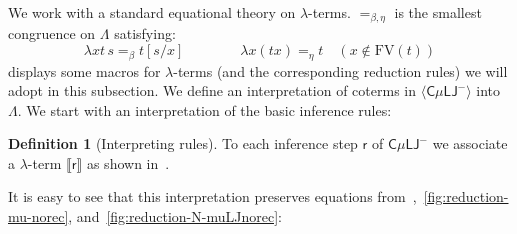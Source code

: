 \documentclass[10pt,a4paper]{amsart}
\theoremstyle{plain}
\theoremstyle{definition}
\newtheorem{defn}[defn]{Definition}
\newcommand{\dfn}{:=}
\newcommand{\red}[1]{{\color{red}#1}}
\newcommand{\gianluca}[1]{\todo[color=purple]{G: #1}}
\renewcommand{\todo}[1]{}
\renewcommand{\gianluca}[1]{}
\newcommand{\todonew}[1]{{\red{TodoNew: #1}}}
\renewcommand{\todonew}[1]{}
\theoremstyle{plain}
\theoremstyle{definition} %
\newcommand{\FV}{\mathrm{FV}}
\newcommand{\sem}[1]{\llbracket {#1} \rrbracket}
\newcommand{\lambdaterms}{\Lambda}
\newcommand{\closure}[1]{\langle #1 \rangle}
\newcommand{\infrule}{\mathsf{r}}
\newcommand{\rrule}{\infrule} %
\newcommand{\LJ}{\mathsf{LJ}}
\newcommand{\muLJ}{\mu\LJ}
\newcommand{\circular}{\mathsf C}
\newcommand{\cmuLJ}{\circular\muLJ}
\newcommand{\cmuLJneg}{\cmuLJ^-}
\newcommand{\reduction}{\mathrm{r}}
\newcommand{\converts}{=_{\reduction}}
\newcommand{\eqter}{\converts} %
\newcommand{\betae}{=_{\beta}}
\newcommand{\betaeta}{=_{\beta, \eta}}
\begin{document}
We work with a standard equational theory on $\lambda$-terms. 
$\betaeta$ is the smallest congruence on $\lambdaterms$ satisfying:
\[
\lambda x t\,  s \betae  t[s/x] \qquad \qquad \lambda x ( tx) =_\eta t \quad (x \not \in  \FV(t))
\]
 displays some macros for $\lambda$-terms (and the corresponding reduction rules) we will adopt in this subsection.
 We define an interpretation of coterms in $\closure \cmuLJneg$ into $\Lambda$.  
 We start with an interpretation of the basic inference rules: 

\todonew{A: I think we need to interpret regular coderivations first, and then extend to terms of $\closure \cmuLJneg$}

 \begin{defn}[Interpreting rules] To each inference step $\rrule$ of $\cmuLJneg$ we associate a $\lambda$-term  $\sem \rrule$ as shown in~. 
 \end{defn}
 
It is easy to see that this interpretation preserves equations from~,~\ref{fig:reduction-mu-norec}, and~\ref{fig:reduction-N-muLJnorec}:

 
\end{document}
